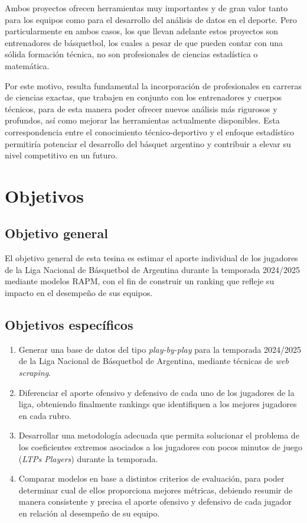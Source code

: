 \documentclass[
]{article}
\begin{document}
Ambos proyectos ofrecen herramientas muy importantes y de gran valor
tanto para los equipos como para el desarrollo del análisis de datos en
el deporte. Pero particularmente en ambos casos, los que llevan adelante
estos proyectos son entrenadores de básquetbol, los cuales a pesar de
que pueden contar con una sólida formación técnica, no son profesionales
de ciencias estadística o matemática.

Por este motivo, resulta fundamental la incorporación de profesionales
en carreras de ciencias exactas, que trabajen en conjunto con los
entrenadores y cuerpos técnicos, para de esta manera poder ofrecer
nuevos análisis más rigurosos y profundos, así como mejorar las
herramientas actualmente disponibles. Esta correspondencia entre el
conocimiento técnico-deportivo y el enfoque estadístico permitiría
potenciar el desarrollo del básquet argentino y contribuir a elevar su
nivel competitivo en un futuro.

\newpage

\section{Objetivos}\label{objetivos}

\subsection{Objetivo general}\label{objetivo-general}

El objetivo general de esta tesina es estimar el aporte individual de
los jugadores de la Liga Nacional de Básquetbol de Argentina durante la
temporada 2024/2025 mediante modelos RAPM, con el fin de construir un
ranking que refleje su impacto en el desempeño de sus equipos.

\subsection{Objetivos específicos}\label{objetivos-especuxedficos}

\begin{enumerate}
\def\labelenumi{\arabic{enumi})}
\item
  Generar una base de datos del tipo \emph{play-by-play} para la
  temporada 2024/2025 de la Liga Nacional de Básquetbol de Argentina,
  mediante técnicas de \emph{web scraping}.
\item
  Diferenciar el aporte ofensivo y defensivo de cada uno de los
  jugadores de la liga, obteniendo finalmente rankings que identifiquen
  a los mejores jugadores en cada rubro.
\item
  Desarrollar una metodología adecuada que permita solucionar el
  problema de los coeficientes extremos asociados a los jugadores con
  pocos minutos de juego (\emph{LTPs Players}) durante la temporada.
\item
  Comparar modelos en base a distintos criterios de evaluación, para
  poder determinar cual de ellos proporciona mejores métricas, debiendo
  resumir de manera consistente y precisa el aporte ofensivo y defensivo
  de cada jugador en relación al desempeño de su equipo.
\end{enumerate}
\end{document}
